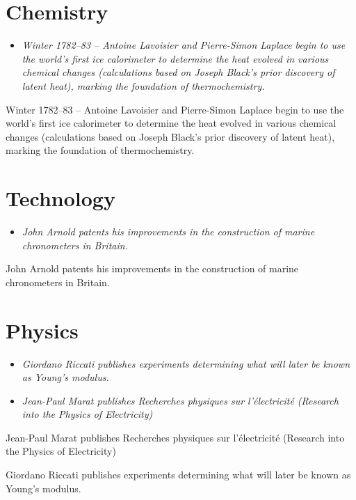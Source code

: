 \section{Chemistry}\label{chemistry}

\begin{itemize}
\item
  \emph{Winter 1782--83 -- Antoine Lavoisier and Pierre-Simon Laplace
  begin to use the world's first ice calorimeter to determine the heat
  evolved in various chemical changes (calculations based on Joseph
  Black's prior discovery of latent heat), marking the foundation of
  thermochemistry.}
\end{itemize}

Winter 1782--83 -- Antoine Lavoisier and Pierre-Simon Laplace begin to
use the world's first ice calorimeter to determine the heat evolved in
various chemical changes (calculations based on Joseph Black's prior
discovery of latent heat), marking the foundation of thermochemistry.

\section{Technology}\label{technology}

\begin{itemize}
\item
  \emph{John Arnold patents his improvements in the construction of
  marine chronometers in Britain.}
\end{itemize}

John Arnold patents his improvements in the construction of marine
chronometers in Britain.

\section{Physics}\label{physics}

\begin{itemize}
\item
  \emph{Giordano Riccati publishes experiments determining what will
  later be known as Young's modulus.}
\item
  \emph{Jean-Paul Marat publishes Recherches physiques sur l'électricité
  (Research into the Physics of Electricity)}
\end{itemize}

Jean-Paul Marat publishes Recherches physiques sur l'électricité
(Research into the Physics of Electricity)

Giordano Riccati publishes experiments determining what will later be
known as Young's modulus.

